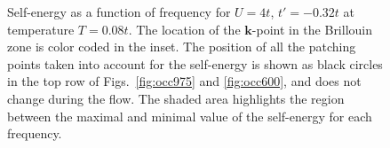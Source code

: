 \begin{figure}[tbh]
  \caption{Self-energy as a function of frequency for $U=4t$, $t'=-0.32t$ at  temperature $T=0.08t$.
The location of the $\mathbf{k}$-point in the Brillouin zone is color coded in the inset. The position of all the patching points taken into account for the self-energy is shown as black circles in the top row of Figs.~\ref{fig:occ975} and \ref{fig:occ600}, and does not change during the flow.
The shaded area highlights the region between the maximal and minimal value of the self-energy for each frequency. }
  \label{fig:selffermi}
\end{figure}


